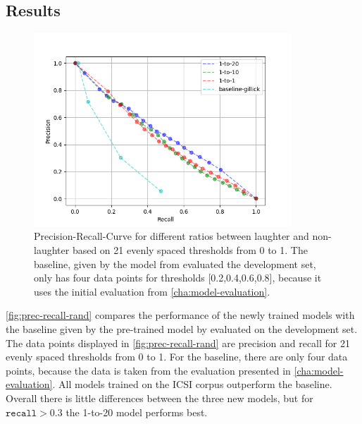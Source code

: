 \documentclass[bsc,frontabs,parskip,deptreport]{infthesis}
\begin{document}
\subsection{Results} \label{sec:exp1-res}

\begin{figure}[h!]
    \centering
    \includegraphics[width = 3.8in]{imgs/prec-recall/exp1-random/dev_compare_class_balance_dev_set.png}
    \caption{Precision-Recall-Curve for different ratios between laughter and non-laughter based on 21 evenly spaced thresholds from 0 to 1.  The baseline, given by the model from \citet{gillick2021robust} evaluated the development set, only has four data points for thresholds [0.2,0.4,0.6,0.8], because it uses the initial evaluation from \autoref{cha:model-evaluation}.}
    \label{fig:prec-recall-rand}
\end{figure}

\autoref{fig:prec-recall-rand} compares the performance of the newly trained models with the baseline given by the pre-trained model by \citet{gillick2021robust} evaluated on the development set.
The data points displayed in \autoref{fig:prec-recall-rand} are precision and recall for 21 evenly spaced thresholds from 0 to 1. For the baseline, there are only four data points, because the data is taken from the evaluation presented in \autoref{cha:model-evaluation}.
All models trained on the ICSI corpus outperform the baseline.
Overall there is little differences between the three new models, but for $\mathtt{recall} > 0.3$ the 1-to-20 model performs best. 
\end{document}

